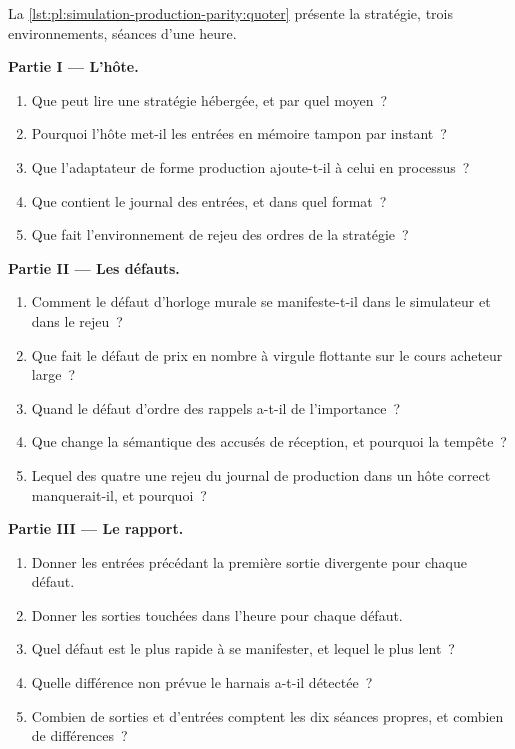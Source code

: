 \begin{problem}\label{pb:pl:simulation-production-parity:1}
La \cref{lst:pl:simulation-production-parity:quoter} présente la stratégie, trois environnements, séances d'une heure.

\medskip\noindent\textbf{Partie I --- L'hôte.}
\begin{enumerate}
\item Que peut lire une stratégie hébergée, et par quel moyen~?
\item Pourquoi l'hôte met-il les entrées en mémoire tampon par instant~?
\item Que l'adaptateur de forme production ajoute-t-il à celui en processus~?
\item Que contient le journal des entrées, et dans quel format~?
\item Que fait l'environnement de rejeu des ordres de la stratégie~?
\end{enumerate}

\medskip\noindent\textbf{Partie II --- Les défauts.}
\begin{enumerate}[resume]
\item Comment le défaut d'horloge murale se manifeste-t-il dans le simulateur et dans le rejeu~?
\item Que fait le défaut de prix en nombre à virgule flottante sur le cours acheteur large~?
\item Quand le défaut d'ordre des rappels a-t-il de l'importance~?
\item Que change la sémantique des accusés de réception, et pourquoi la tempête~?
\item Lequel des quatre une rejeu du journal de production dans un hôte correct manquerait-il, et pourquoi~?
\end{enumerate}

\medskip\noindent\textbf{Partie III --- Le rapport.}
\begin{enumerate}[resume]
\item Donner les entrées précédant la première sortie divergente pour chaque défaut.
\item Donner les sorties touchées dans l'heure pour chaque défaut.
\item Quel défaut est le plus rapide à se manifester, et lequel le plus lent~?
\item Quelle différence non prévue le harnais a-t-il détectée~?
\item Combien de sorties et d'entrées comptent les dix séances propres, et combien de différences~?
\end{enumerate}


\end{problem}
